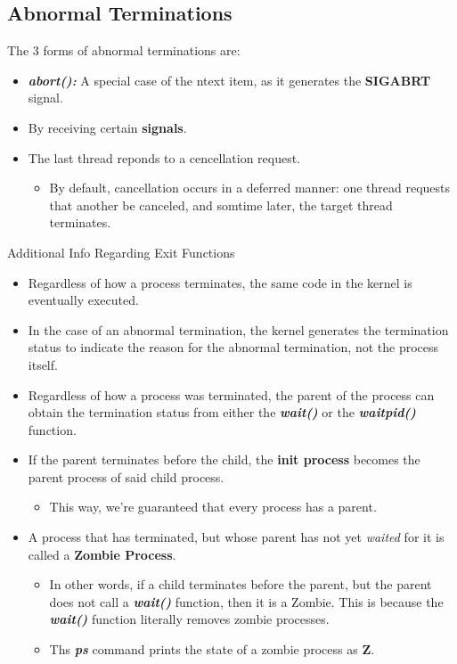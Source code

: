 \documentclass{article}
\newcommand\be[1]{\textbf{\emph{#1}}}
\begin{document}
\subsection{Abnormal Terminations}
The 3 forms of abnormal terminations are:
\begin{itemize}
    \item \be{abort():} A special case of the ntext item, as it
        generates the \textbf{SIGABRT} signal.
    \item By receiving certain \textbf{signals}.
    \item The last thread reponds to a cencellation request.
        \begin{itemize}
            \item By default, cancellation occurs in a deferred manner:
                one thread requests that another be canceled, and somtime later,
                the target thread terminates. \newline
        \end{itemize}
\end{itemize}

Additional Info Regarding Exit Functions
\begin{itemize}
    \item Regardless of how a process terminates, the same code in the kernel is eventually executed.
    \item In the case of an abnormal termination, the kernel generates the termination status
        to indicate the reason for the abnormal termination, not the process itself.
    \item Regardless of how a process was terminated, the parent of the process can obtain the termination status
        from either the \be{wait()} or the \be{waitpid()} function.
    \item If the parent terminates before the child, the \textbf{init process} becomes
        the parent process of said child process.
        \begin{itemize}
            \item This way, we're guaranteed that every process has a parent.
        \end{itemize}
    \item A process that has terminated, but whose parent has not yet \emph{waited} for it is called a \textbf{Zombie Process}.
        \begin{itemize}
            \item In other words, if a child terminates before the parent, but the parent does not call a \be{wait()} function, 
                then it is a Zombie. This is because the \be{wait()} function literally removes
                zombie processes.
            \item Ths \be{ps} command prints the state of a zombie process as \textbf{Z}.
        \end{itemize}
\end{itemize}
\end{document}
